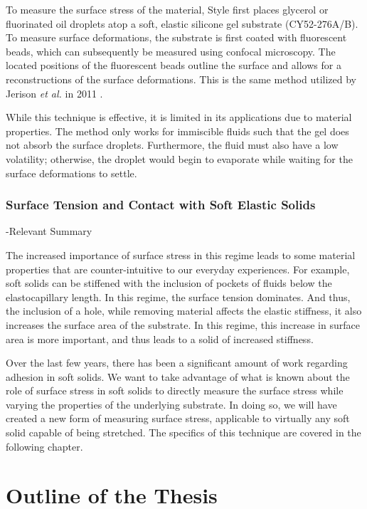 To measure the surface stress of the material, Style first places glycerol or fluorinated oil droplets atop a soft, elastic silicone gel substrate (CY52-276A/B). To measure surface deformations, the substrate is first coated with fluorescent beads, which can subsequently be measured using confocal microscopy. The located positions of the fluorescent beads outline the surface and allows for a reconstructions of the surface deformations. This is the same method utilized by Jerison \emph{et al.} in 2011  \cite{jerison2011deformation}.

While this technique is effective, it is limited in its applications due to material properties. The method only works for immiscible fluids such that the gel does not absorb the surface droplets. Furthermore, the fluid must also have a low volatility; otherwise, the droplet would begin to evaporate while waiting for the surface deformations to settle.

\subsubsection{Surface Tension and Contact with Soft Elastic Solids}
-Relevant Summary


The increased importance of surface stress in this regime leads to some material properties that are counter-intuitive to our everyday experiences. For example, soft solids can be stiffened with the inclusion of pockets of fluids below the elastocapillary length. In this regime, the surface tension dominates. And thus, the inclusion of a hole, while removing material affects the elastic stiffness, it also increases the surface area of the substrate. In this regime, this increase in surface area is more important, and thus leads to a solid of increased stiffness.

Over the last few years, there has been a significant amount of work regarding adhesion in soft solids. We want to take advantage of what is known about the role of surface stress in soft solids to directly measure the surface stress while varying the properties of the underlying substrate. In doing so, we will have created a new form of measuring surface stress, applicable to virtually any soft solid capable of being stretched. The specifics of this technique are covered in the following chapter.


\section{Outline of the Thesis}